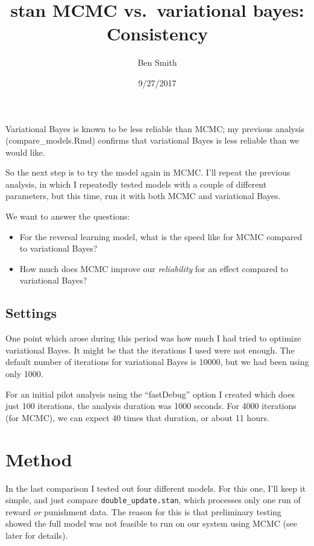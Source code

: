 \documentclass[]{article}
\title{stan MCMC vs.~variational bayes: Consistency}
\author{Ben Smith}
\date{9/27/2017}
\providecommand{\tightlist}{%
  \setlength{\itemsep}{0pt}\setlength{\parskip}{0pt}}
\begin{document}
\maketitle

Variational Bayes is known to be less reliable than MCMC; my previous
analysis (compare\_models.Rmd) confirms that variational Bayes is less
reliable than we would like.

So the next step is to try the model again in MCMC. I'll repeat the
previous analysis, in which I repeatedly tested models with a couple of
different parameters, but this time, run it with both MCMC and
variational Bayes.

We want to answer the questions:

\begin{itemize}
\tightlist
\item
  For the reversal learning model, what is the speed like for MCMC
  compared to variational Bayes?
\item
  How much does MCMC improve our \emph{reliability} for an effect
  compared to variational Bayes?
\end{itemize}

\subsection{Settings}\label{settings}

One point which arose during this period was how much I had tried to
optimize variational Bayes. It might be that the iterations I used were
not enough. The default number of iterations for variational Bayes is
10000, but we had been using only 1000.

For an initial pilot analysis using the ``fastDebug'' option I created
which does just 100 iterations, the analysis duration was 1000 seconds.
For 4000 iterations (for MCMC), we can expect 40 times that duration, or
about 11 hours.

\section{Method}\label{method}

In the last comparison I tested out four different models. For this one,
I'll keep it simple, and just compare \texttt{double\_update.stan},
which processes only one run of reward \emph{or} punishment data. The
reason for this is that preliminary testing showed the full model was
not feasible to run on our system using MCMC (see later for details).
\end{document}
